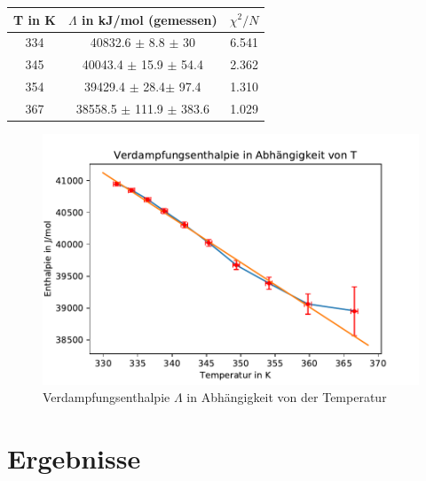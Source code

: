\documentclass[]{article}
\begin{document}
		
	\begin{center}
		\begin{tabular}{|c|c|c|}
			\hline
			T in K &  $\Lambda$ in kJ/mol (gemessen) & $\chi^2/N$\\
			\hline
			\hline
			334 & 40832.6 $\pm$ 8.8 $\pm$ 30 & 6.541\\
			\hline
			345 & 40043.4 $\pm$ 15.9 $\pm$ 54.4 & 2.362\\
			\hline
			354 & 39429.4 $\pm$ 28.4$\pm$ 97.4 & 1.310\\
			\hline
			367 & 38558.5 $\pm$ 111.9 $\pm$ 383.6 & 1.029\\
			\hline  			
		\end{tabular} 
	\end{center}
	\begin{figure}
		\begin{center}
			\includegraphics[scale=0.9]{Images/Dampfdruck_L.pdf}
			\caption{Verdampfungsenthalpie $\Lambda$ in Abhängigkeit von der Temperatur}
			\label{DD_L(T)}
		\end{center}
	\end{figure}
	
	\section{Ergebnisse}
	
\end{document}
